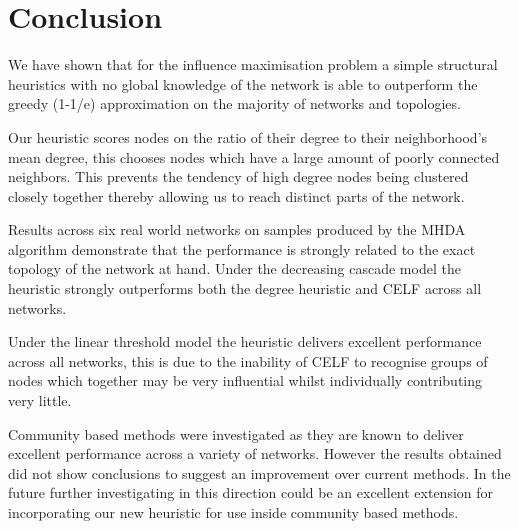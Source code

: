 \documentclass{article}
\begin{document}
\clearpage
\section{Conclusion}

We have shown that for the influence maximisation problem a simple structural heuristics with no global knowledge of the network is able to outperform the greedy (1-1/e) approximation on the majority of networks and topologies.

Our heuristic scores nodes on the ratio of their degree to their neighborhood's mean degree, this chooses nodes which have a large amount of poorly connected neighbors.
This prevents the tendency of high degree nodes being clustered closely together thereby allowing us to reach distinct parts of the network.

Results across six real world networks on samples produced by the MHDA algorithm demonstrate that the performance is strongly related to the exact topology of the network at hand.
Under the decreasing cascade model the heuristic strongly outperforms both the degree heuristic and CELF across all networks.

Under the linear threshold model the heuristic delivers excellent performance across all networks, this is due to the inability of CELF to recognise groups of nodes which together may be very influential whilst individually contributing very little.

Community based methods were investigated as they are known to deliver excellent performance across a variety of networks.
However the results obtained did not show conclusions to suggest an improvement over current methods.
In the future further investigating in this direction could be an excellent extension for incorporating our new heuristic for use inside community based methods.

\newpage
{}

\end{document}
